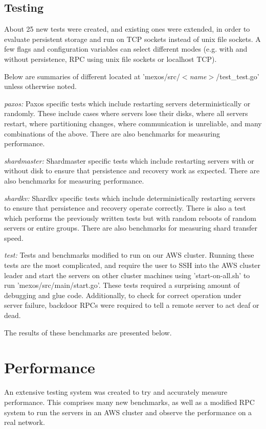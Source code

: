 \documentclass[letterpaper,10pt]{article}
\begin{document}
\subsection{Testing}
About 25 new tests were created, and existing ones were extended, in order to evaluate persistent storage and run on TCP sockets instead of unix file sockets.  A few flags and configuration variables can select different modes (e.g. with and without persistence, RPC using unix file sockets or localhost TCP).

Below are summaries of different located at 'mexos/src/\emph{$<$name$>$}/test\_test.go' unless otherwise noted.

\emph{paxos:} Paxos specific tests which include restarting servers deterministically or randomly.  These include cases where servers lose their disks, where all servers restart, where partitioning changes, where communication is unreliable, and many combinations of the above.  There are also benchmarks for measuring performance.

\emph{shardmaster:} Shardmaster specific tests which include restarting servers with or without disk to ensure that persistence and recovery work as expected.  There are also benchmarks for measuring performance.

\emph{shardkv:} Shardkv specific tests which include deterministically restarting servers to ensure that persistence and recovery operate correctly.  There is also a test which performs the previously written tests but with random reboots of random servers or entire groups.  There are also benchmarks for measuring shard transfer speed.

\emph{test:} Tests and benchmarks modified to run on our AWS cluster.  Running these tests are the most complicated, and require the user to SSH into the AWS cluster leader and start the servers on other cluster machines using 'start-on-all.sh' to run 'mexos/src/main/start.go'. These tests required a surprising amount of debugging and glue code.  Additionally, to check for correct operation under server failure, backdoor RPCs were required to tell a remote server to act deaf or dead.

The results of these benchmarks are presented below.

\section{Performance}

An extensive testing system was created to try and accurately measure performance.  This comprises many new benchmarks, as well as a modified RPC system to run the servers in an AWS cluster and observe the performance on a real network.
\end{document}
